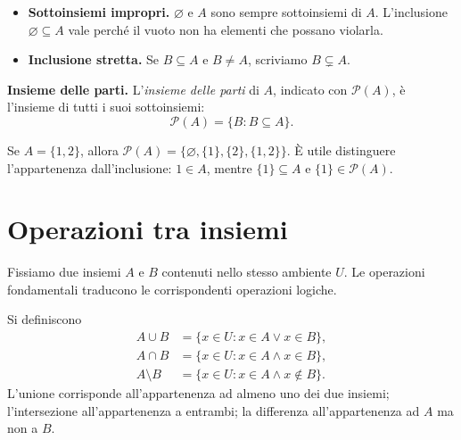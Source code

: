 \begin{itemize}
  \item \textbf{Sottoinsiemi impropri.} $\varnothing$ e $A$ sono sempre sottoinsiemi di $A$. L'inclusione $\varnothing\subseteq A$ vale perché il vuoto non ha elementi che possano violarla.
  \item \textbf{Inclusione stretta.} Se $B\subseteq A$ e $B\ne A$, scriviamo $B\subsetneq A$.
\end{itemize}

\textbf{Insieme delle parti.} L'\emph{insieme delle parti} di $A$, indicato con $\mathcal P(A)$, è l'insieme di tutti i suoi sottoinsiemi:
\[
  \mathcal P(A)=\{B:B\subseteq A\}.
\]
\begin{esempio}
Se $A=\{1,2\}$, allora $\mathcal P(A)=\{\varnothing,\{1\},\{2\},\{1,2\}\}$. È utile distinguere l'appartenenza dall'inclusione: $1\in A$, mentre $\{1\}\subseteq A$ e $\{1\}\in\mathcal P(A)$.
\end{esempio}

\section{Operazioni tra insiemi}

Fissiamo due insiemi $A$ e $B$ contenuti nello stesso ambiente $U$. Le operazioni fondamentali traducono le corrispondenti operazioni logiche.

\begin{definizione}
Si definiscono
\begin{align*}
  A\cup B&=\{x\in U:x\in A\lor x\in B\},\\
  A\cap B&=\{x\in U:x\in A\land x\in B\},\\
  A\setminus B&=\{x\in U:x\in A\land x\notin B\}.
\end{align*}
L'unione corrisponde all'appartenenza ad almeno uno dei due insiemi; l'intersezione all'appartenenza a entrambi; la differenza all'appartenenza ad $A$ ma non a $B$.
\end{definizione}


